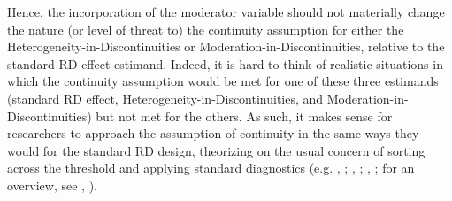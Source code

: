 \documentclass[12pt]{article}
\makeatletter
\renewcommand{\subsection}{\@startsection{subsection}{2}{0mm}{-\baselineskip}{0.25\baselineskip}{\raggedright\normalfont\normalsize\bf}}
\makeatother
\begin{document}
Hence, the incorporation of the moderator variable should not materially change the nature (or level of threat to) the continuity assumption for either the Heterogeneity-in-Discontinuities or Moderation-in-Discontinuities, relative to the standard RD effect estimand. Indeed, it is hard to think of realistic situations in which the continuity assumption would be met for one of these three estimands (standard RD effect, Heterogeneity-in-Discontinuities, and Moderation-in-Discontinuities) but not met for the others. As such, it makes sense for researchers to approach the assumption of continuity in the same ways they would for the standard RD design, theorizing on the usual concern of sorting across the threshold and applying standard diagnostics (e.g. \citeauthor{mccrary2008manipulation}, \citeyear{mccrary2008manipulation}; \citeauthor{cattaneo2020simple}, \citeyear{cattaneo2020simple}; \citeauthor{hartman2021equivalence}, \citeyear{hartman2021equivalence}; for an overview, see \citeauthor{cattaneo2021regression}, \citeyear{cattaneo2021regression}).







%
%
%
%
\end{document}

